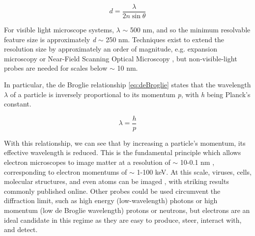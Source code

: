         \begin{equation}\label{eq:diffraction}
            d = \frac{\lambda}{2n\sin{\theta}}
        \end{equation}
        
        For visible light microscope systems, $\lambda$ $\sim$ 500 nm, and so the minimum resolvable feature size is approximately \textit{d} $\sim$ 250 nm. Techniques exist to extend the resolution size by approximately an order of magnitude, e.g. expansion microscopy \cite{Chen2015ExpansionMicroscopy} or Near-Field Scanning Optical Microscopy \cite{Ma20216nmSource}, but non-visible-light probes are needed for scales below $\sim$ 10 nm. 

        

        In particular, the de Broglie relationship \ref{eq:deBroglie} \cite{Broglie1924XXXV.Quanta/i} states that the wavelength $\lambda$ of a particle is inversely proportional to its momentum \textit{p}, with \textit{h} being Planck's constant. 
        
            \begin{equation}\label{eq:deBroglie}
               \lambda = \frac{h}{p}
            \end{equation}

        With this relationship, we can see that by increasing a particle's momentum, its effective wavelength is reduced. This is the fundamental principle which allows electron microscopes to image matter at a resolution of $\sim$ 10-0.1 nm \cite{Franken2020ADevelopments}, corresponding to electron momentums of $\sim$ 1-100 keV. At this scale, viruses, cells, molecular structures, and even atoms can be imaged \cite{Williams2009TransmissionMicroscopy}, with striking results commonly published online. Other probes could be used circumvent the diffraction limit, such as high energy (low-wavelength) photons or high momentum (low de Broglie wavelength) protons or neutrons, but electrons are an ideal candidate in this regime as they are easy to produce, steer, interact with, and detect. 

